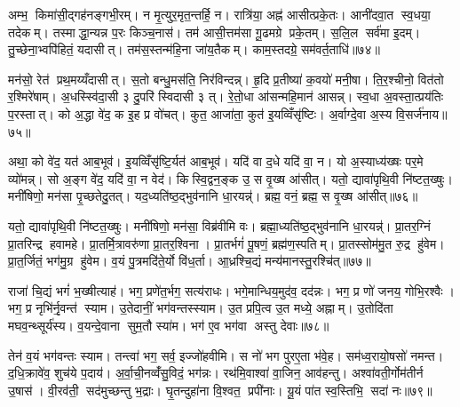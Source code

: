अम्भ॒ किमा॑सी॒द्गह॑नङ्गभी॒रम्। न मृ॒त्युर॒मृत॒न्तर्\mbox{}हि॒ न। रात्रि॑या॒ अह्न॑ आसीत्प्रके॒तः। आनी॑दवा॒त स्व॒धया॒ तदेकम्। तस्माद्धा॒न्यन्न प॒रः किञ्च॒नास॑। तम॑ आसी॒त्तम॑सा गू॒ढमग्रे प्रके॒तम्। स॒लि॒ल सर्व॑मा इ॒दम्। तु॒च्छेना॒भ्वपि॑हितं॒ यदासीत्। तम॑स॒स्तन्म॑हि॒ना जा॑य॒तैकम्। काम॒स्तदग्रे॒ सम॑वर्त॒ताधि॑॥७४॥

मन॑सो॒ रेत॑ प्रथ॒मय्यँदासीत्। स॒तो बन्धु॒मस॑ति॒ निर॑विन्दन्न्। हृ॒दि प्र॒तीष्या॑ क॒वयो॑ मनी॒षा। ति॒र॒श्चीनो॒ वित॑तो र॒श्मिरे॑षाम्। अ॒धस्स्वि॑दा॒सी ३ दु॒परि॑ स्विदासी ३ त्। रे॒तो॒धा आ॑सन्महि॒मान॑ आसन्न्। स्व॒धा अ॒वस्ता॒त्प्रय॑तिः प॒रस्तात्। को अ॒द्धा वे॑द॒ क इ॒ह प्र वो॑चत्। कुत॒ आजा॑ता॒ कुत॑ इ॒यव्विँसृ॑ष्टिः। अ॒र्वाग्दे॒वा अ॒स्य वि॒सर्ज॑नाय॥७५॥

अथा॒ को वे॑द॒ यत॑ आब॒भूव॑। इ॒यव्विँसृ॑ष्टि॒र्यत॑ आब॒भूव॑। यदि॑ वा द॒धे यदि॑ वा॒ न। यो अ॒स्याध्य॑ख्षः पर॒मे व्यो॑मन्न्। सो अ॒ङ्ग वे॑द॒ यदि॑ वा॒ न वेद॑। किस्वि॒द्वन॒ङ्क उ॒ स वृ॒ख्ष आ॑सीत्। यतो॒ द्यावा॑पृथि॒वी नि॑ष्टत॒ख्षुः। मनी॑षिणो॒ मन॑सा पृ॒च्छतेदु॒तत्। यद॒ध्यति॑ष्ठ॒द्भुव॑नानि धा॒रयन्न्॑। ब्रह्म॒ वनं॒ ब्रह्म॒ स वृ॒ख्ष आ॑सीत्॥७६॥

यतो॒ द्यावा॑पृथि॒वी नि॑ष्टत॒ख्षुः। मनी॑षिणो॒ मन॑सा॒ विब्र॑वीमि वः। ब्रह्मा॒ध्यति॑ष्ठ॒द्भुव॑नानि धा॒रयन्न्॑। प्रा॒तर॒ग्निं प्रा॒तरिन्द्र हवामहे। प्रा॒तर्मि॒त्रावरु॑णा प्रा॒तर॒श्विना। प्रा॒तर्भगं॑ पू॒षणं॒ ब्रह्म॑ण॒स्पतिम्। प्रा॒तस्सोम॑मु॒त रु॒द्र हु॑वेम। प्रा॒त॒र्जितं॒ भग॑मु॒ग्र हु॑वेम। व॒यं पु॒त्रमदि॑ते॒र्यो वि॑ध॒र्ता। आ॒ध्रश्चि॒द्यं मन्य॑मानस्तु॒रश्चि॑त्॥७७॥

राजा॑ चि॒द्यं भगं॑ भ॒ख्षीत्याह॑। भग॒ प्रणे॑त॒र्भग॒ सत्य॑राधः। भगे॒मान्धिय॒मुद॑व॒ दद॑न्नः। भग॒ प्र णो॑ जनय॒ गोभि॒रश्वैः। भग॒ प्र नृभि॑र्नृ॒वन्त॑ स्याम। उ॒तेदानीं॒ भग॑वन्तस्स्याम। उ॒त प्रपि॒त्व उ॒त मध्ये॒ अह्नाम्। उ॒तोदि॑ता मघव॒न्थ्सूर्य॑स्य। व॒यन्दे॒वाना सुम॒तौ स्या॑म। भग॑ ए॒व भग॑वा अस्तु देवाः॥७८॥

तेन॑ व॒यं भग॑वन्तः स्याम। तन्त्वा॑ भग॒ सर्व॒ इज्जो॑हवीमि। स नो॑ भग पुरए॒ता भ॑वे॒ह। सम॑ध्व॒रायो॒षसो॑ नमन्त। द॒धि॒क्रावे॑व॒ शुच॑ये प॒दाय॑। अ॒र्वा॒ची॒नव्वँ॑सु॒विदं॒ भग॑न्नः। रथ॑मि॒वाश्वा॑ वा॒जिन॒ आव॑हन्तु। अश्वा॑वती॒र्गोम॑तीर्न उ॒षास॑। वी॒रव॑ती॒ सद॑मुच्छन्तु भ॒द्राः। घृ॒तन्दुहा॑ना वि॒श्वत॒ प्रपी॑नाः। यू॒यं पा॑त स्व॒स्तिभि॒ सदा॑ नः॥७९॥

\clearpage
{}


